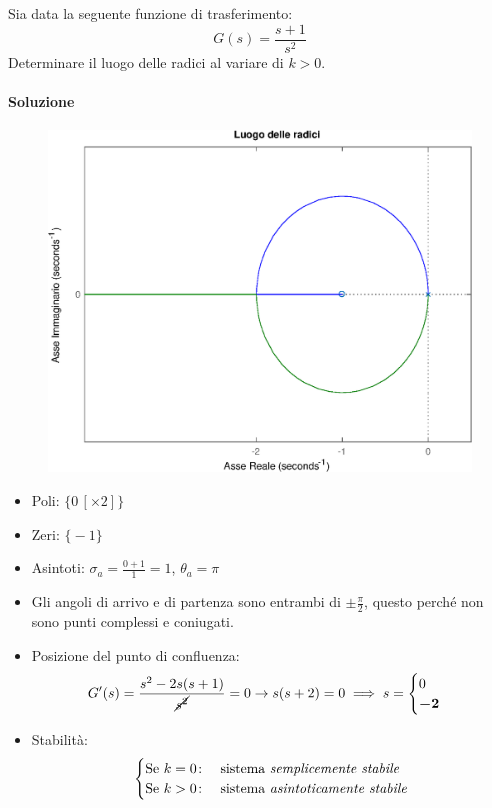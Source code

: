 \begin{esercizio}
Sia data la seguente funzione di trasferimento:
\[
	G(s) = \frac{s+1}{s^2}
\]
Determinare il luogo delle radici al variare di \(k > 0\).

\paragraph{Soluzione}

\begin{figure}[ht]
	\centering
	\includegraphics[scale=.6]{mod1/assets/rl_ex32}
\end{figure}

\begin{itemize}
	\item Poli: \(\bigl\{ 0\,[\times 2] \bigr\}\)
	\item Zeri: \(\bigl\{ -1 \bigr\}\)
	\item Asintoti: \(\sigma_a = \frac{0+1}{1} = 1\), \(\theta_a = \pi\)
	\item Gli angoli di arrivo e di partenza sono entrambi di
		\(\pm \frac{\pi}{2}\), questo perché non sono punti complessi e
		coniugati.
	\item Posizione del punto di confluenza:
		\[
			G^\prime(s) = \frac{s^2 -2s(s+1)}{\cancel{s^2}} = 0
			\rightarrow s(s+2) = 0
			\implies s= \begin{cases} 0 \\ \bm{-2} \end{cases}
		\]
	\item Stabilità:
		\[\begin{cases}
			\text{Se } k = 0\colon & \text{sistema \emph{semplicemente stabile}} \\
			\text{Se } k > 0\colon & \text{sistema \emph{asintoticamente stabile}}
		\end{cases}\]
\end{itemize}
\end{esercizio}

